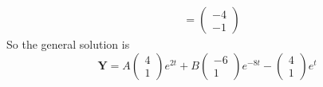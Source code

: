 \documentclass[a4paper]{article}
\begin{document}
\begin{eg}
\begin{align*}
    &=
    \begin{pmatrix}
      -4\\-1
    \end{pmatrix}
  \end{align*}
  So the general solution is
  \[
    \mathbf{Y} = A
    \begin{pmatrix}
      4\\1
    \end{pmatrix}e^{2t} + B
    \begin{pmatrix}
      -6\\1
    \end{pmatrix}e^{-8t} -
    \begin{pmatrix}
      4\\1
    \end{pmatrix}e^t
  \]
\end{eg}
\end{document}
